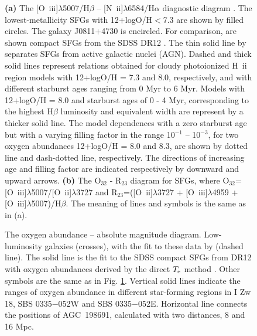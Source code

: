 \documentclass[useAMS,usenatbib]{mn2e}
\begin{document}
\begin{figure}%
\caption{ {\bf (a)} The [O~{\sc iii}]$\lambda$5007/H$\beta$ -- 
[N~{\sc ii}]$\lambda$6584/H$\alpha$ diagnostic diagram 
\citep*[BPT;][]{BPT81}. The lowest-metallicity SFGs with 12+logO/H$<$7.3
are shown by filled circles. The galaxy J0811$+$4730 is encircled.
For comparison, are shown compact SFGs from the SDSS DR12
\citep[grey dots, ][]{I16c}. The thin solid line by \citet{K03} 
separates SFGs from active galactic nuclei (AGN). 
Dashed and thick solid lines represent relations obtained for
{\sc cloudy} photoionized H~{\sc ii} region models with 12+logO/H = 7.3 and
8.0, respectively, and with different starburst 
ages ranging from 0 Myr to 6 Myr. Models with 12+logO/H = 8.0 and 
starburst ages of 0 - 4 Myr, corresponding to the highest H$\beta$ luminosity 
and equivalent width are represent by a thicker solid line.
The model dependences with a zero
starburst age but with a varying filling factor in the range 10$^{-1}$ -- 
10$^{-3}$, for two oxygen abundances 12+logO/H = 8.0 and 8.3, are shown by dotted
line and dash-dotted line, respectively. The directions of increasing age 
and filling factor are indicated respectively by downward and upward arrows.
{\bf (b)} The O$_{32}$ - R$_{23}$ diagram for SFGs, where 
O$_{32}$=[O~{\sc iii}]$\lambda$5007/[O~{\sc ii}]$\lambda$3727 and 
R$_{23}$=([O~{\sc ii}]$\lambda$3727 +
[O~{\sc iii}]$\lambda$4959 + [O~{\sc iii}]$\lambda$5007)/H$\beta$.
The meaning of lines and symbols is the same as in (a). 
}
\label{fig4}
\end{figure}

\begin{figure}%
\centering{
\texttt{[image: Mg\_o.ps]}
}
\caption{The oxygen abundance -- absolute magnitude diagram. Low-luminosity
galaxies (crosses), with the fit to these data by \citet{B12} (dashed line).
The solid line is the fit to the SDSS compact SFGs from DR12 with oxygen 
abundances derived by the direct $T_{\rm e}$ method \citep[grey dots, ][]{I16c}.
Other symbols are the same as in Fig. \ref{fig4}.
Vertical solid lines indicate the ranges of oxygen abundance in different 
star-forming regions in I Zw 18, SBS 0335$-$052W and SBS 0335$-$052E. 
Horizontal line connects the positions of AGC~198691, calculated 
with two distances, 8 and 16 Mpc.}
\label{fig5}
\end{figure}
\end{document}
